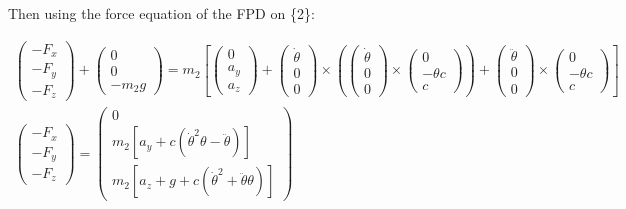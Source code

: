 \documentclass[\main/main.tex]{subfiles}
\begin{document}
%

Then using the force equation of the \ac{FPD} on \{2\}:

\begin{gather*}
  \begin{pmatrix}
  - F_x \\
  - F_y \\
  - F_z
  \end{pmatrix}
  +
  \begin{pmatrix}
  0 \\
  0 \\
  -m_2 g
  \end{pmatrix}
  = m_2
  \left[
  \begin{pmatrix}
  0 \\
  a_y \\
  a_z
  \end{pmatrix}
  +
  \begin{pmatrix}
  \dot{\theta} \\
  0 \\
  0
  \end{pmatrix}
  \times
  \left(
  \begin{pmatrix}
  \dot{\theta} \\
  0 \\
  0
  \end{pmatrix}
  \times
  \begin{pmatrix}
  0 \\
  -\theta c \\
  c
  \end{pmatrix}
  \right)
  +
  \begin{pmatrix}
  \ddot{\theta} \\
  0 \\
  0
  \end{pmatrix}
  \times
  \begin{pmatrix}
  0 \\
  -\theta c \\
  c
  \end{pmatrix}
  \right] \\
  \begin{pmatrix}
  - F_x \\
  - F_y \\
  - F_z
  \end{pmatrix}
  =
  \begin{pmatrix}
  0 \\
  m_2 [a_y + c (\dot{\theta}^2 \theta - \ddot{\theta})] \\
  m_2 [a_z + g + c (\dot{\theta}^2 + \ddot{\theta} \theta)]
  \end{pmatrix}
\end{gather*}
\end{document}
